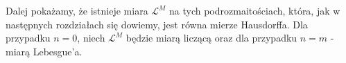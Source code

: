 Dalej pokażamy, że istnieje miara $\mathcal{L}^M$ na tych podrozmaitościach, która, jak w następnych rozdziałach się dowiemy, jest równa mierze Hausdorffa.
Dla przypadku $n=0$, niech $\mathcal{L}^M$ będzie miarą liczącą oraz dla przypadku $n=m$ - miarą Lebesgue'a.
